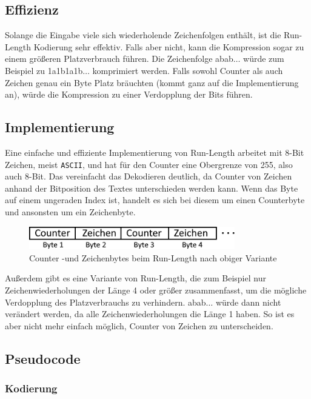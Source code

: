 \documentclass{article}
\begin{document}
\subsection{Effizienz}
Solange die Eingabe viele sich wiederholende Zeichenfolgen enthält, ist die Run-Length 
Kodierung sehr effektiv. Falls aber nicht, kann die Kompression sogar zu einem größeren 
Platzverbrauch führen. 
Die Zeichenfolge \textsf{abab}$\dots$ würde zum Beispiel zu \textsf{1a1b1a1b}$\dots$ komprimiert werden. 
Falls sowohl Counter als auch Zeichen genau ein Byte Platz bräuchten (kommt ganz auf die
Implementierung an), würde die Kompression zu einer Verdopplung der Bits führen.
\subsection{Implementierung}
Eine einfache und effiziente Implementierung von Run-Length arbeitet mit 8-Bit Zeichen, meist \texttt{ASCII},
und hat für den Counter eine Obergrenze von 255, also auch 8-Bit. Das vereinfacht das 
Dekodieren deutlich, da Counter von Zeichen anhand der Bitposition des Textes unterschieden
werden kann. Wenn das Byte auf einem ungeraden Index ist, handelt es sich bei diesem 
um einen Counterbyte und ansonsten um ein Zeichenbyte.
\begin{figure}[H]
    \centering
    \includegraphics*[width=0.8\textwidth]{images/bytesteps.png}
    \caption[Counter -und Zeichenbytes beim Run-Length]{
        Counter -und Zeichenbytes beim Run-Length nach obiger Variante
    }
\end{figure}

Außerdem gibt es eine Variante von Run-Length, die zum Beispiel nur Zeichenwiederholungen der Länge 4 oder größer 
zusammenfasst, um die mögliche Verdopplung des Platzverbrauchs zu verhindern. 
\textsf{abab}$\dots$ würde dann nicht verändert werden, da alle Zeichenwiederholungen die Länge 1 haben.
So ist es aber nicht mehr einfach möglich, Counter von Zeichen zu unterscheiden.
\subsection{Pseudocode}
\subsubsection{Kodierung}

\end{document}
